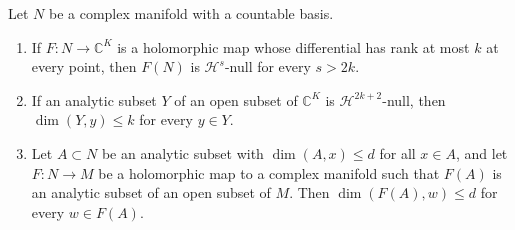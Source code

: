 \begin{lemma}\label{lem:holomorphic-image-dimension}
Let $N$ be a complex manifold with a countable basis.
\begin{enumerate}
\item If $F\colon N\to\mathbb C^K$ is a holomorphic map whose differential has rank at most $k$ at every point, then $F(N)$ is $\mathcal H^s$-null for every $s>2k$.
\item If an analytic subset $Y$ of an open subset of $\mathbb C^K$ is $\mathcal H^{2k+2}$-null, then $\dim(Y,y)\leq k$ for every $y\in Y$.
\item Let $A\subset N$ be an analytic subset with $\dim(A,x)\leq d$ for all $x\in A$, and let $F\colon N\to M$ be a holomorphic map to a complex manifold such that $F(A)$ is an analytic subset of an open subset of $M$. Then $\dim(F(A),w)\leq d$ for every $w\in F(A)$.
\end{enumerate}
\end{lemma}
